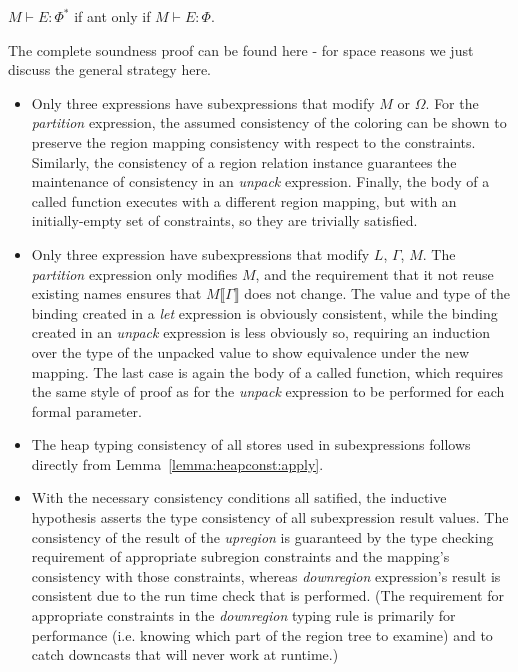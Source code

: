 \begin{lem}
\label{lemma:phiclosure}
$M \vdash E : \Phi^*$ if ant only if $M \vdash E : \Phi$.
\end{lem}

The complete soundness proof can be found here\cite{xyz} - for space reasons we just discuss
the general strategy here.

\begin{itemize}

\item Only three expressions have subexpressions that modify $M$ or $\Omega$.  For the
{\em partition} expression, the assumed consistency of the coloring can be shown to preserve
the region mapping consistency with respect to the constraints.  Similarly, the consistency of 
a region relation instance guarantees the maintenance of consistency in an {\em unpack}
expression.  Finally, the body of a called function executes with a different region mapping,
but with an initially-empty set of constraints, so they are trivially satisfied.

\item Only three expression have subexpressions that modify $L$, $\Gamma$, $M$.  The
{\em partition} expression only modifies $M$, and the requirement that it not reuse existing
names ensures that $M \llbracket \Gamma \rrbracket$ does not change.  The value and type of the
binding created in a {\em let} expression is obviously consistent, while the binding created in
an {\em unpack} expression is less obviously so, requiring an induction over the type of the 
unpacked value to show equivalence under the new mapping.  The last case is again the body of a
called function, which requires the same style of proof as for the {\em unpack} expression to
be performed for each formal parameter.

\item The heap typing consistency of all stores used in subexpressions follows directly from
Lemma~\ref{lemma:heapconst:apply}.

\item With the necessary consistency conditions all satified, the inductive hypothesis asserts
the type consistency of all subexpression result values.  The consistency of the result of 
the {\em upregion} is guaranteed by the type checking requirement of appropriate subregion
constraints and the mapping's consistency with those constraints, whereas {\em downregion}
expression's result is consistent due to the run time check that is performed.  (The requirement
for appropriate constraints in the {\em downregion} typing rule is primarily for performance
(i.e. knowing which part of the region tree to examine) and to catch downcasts that will never
work at runtime.)


\end{itemize}
